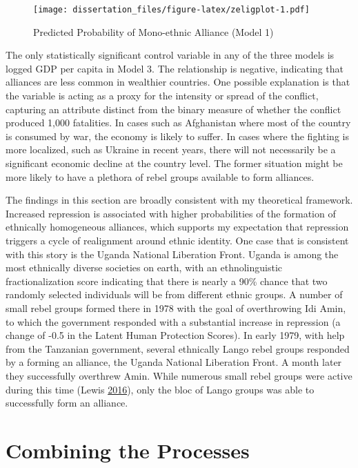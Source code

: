 \documentclass[12pt,]{book}
\theoremstyle{definition}
\theoremstyle{definition}
\theoremstyle{definition}
\theoremstyle{remark}
\begin{document}
\begin{figure}
\centering
\texttt{[image: dissertation\_files/figure-latex/zeligplot-1.pdf]}
\caption{\label{fig:zeligplot}Predicted Probability of Mono-ethnic Alliance
(Model 1)}
\end{figure}

The only statistically significant control variable in any of the three
models is logged GDP per capita in Model 3. The relationship is
negative, indicating that alliances are less common in wealthier
countries. One possible explanation is that the variable is acting as a
proxy for the intensity or spread of the conflict, capturing an
attribute distinct from the binary measure of whether the conflict
produced 1,000 fatalities. In cases such as Afghanistan where most of
the country is consumed by war, the economy is likely to suffer. In
cases where the fighting is more localized, such as Ukraine in recent
years, there will not necessarily be a significant economic decline at
the country level. The former situation might be more likely to have a
plethora of rebel groups available to form alliances.

The findings in this section are broadly consistent with my theoretical
framework. Increased repression is associated with higher probabilities
of the formation of ethnically homogeneous alliances, which supports my
expectation that repression triggers a cycle of realignment around
ethnic identity. One case that is consistent with this story is the
Uganda National Liberation Front. Uganda is among the most ethnically
diverse societies on earth, with an ethnolinguistic fractionalization
score indicating that there is nearly a 90\% chance that two randomly
selected individuals will be from different ethnic groups. A number of
small rebel groups formed there in 1978 with the goal of overthrowing
Idi Amin, to which the government responded with a substantial increase
in repression (a change of -0.5 in the Latent Human Protection Scores).
In early 1979, with help from the Tanzanian government, several
ethnically Lango rebel groups responded by a forming an alliance, the
Uganda National Liberation Front. A month later they successfully
overthrew Amin. While numerous small rebel groups were active during
this time (Lewis \protect\hyperlink{ref-Lewis2016}{2016}), only the bloc
of Lango groups was able to successfully form an alliance.

\hypertarget{combining-the-processes}{%
\section{Combining the Processes}\label{combining-the-processes}}
\end{document}
